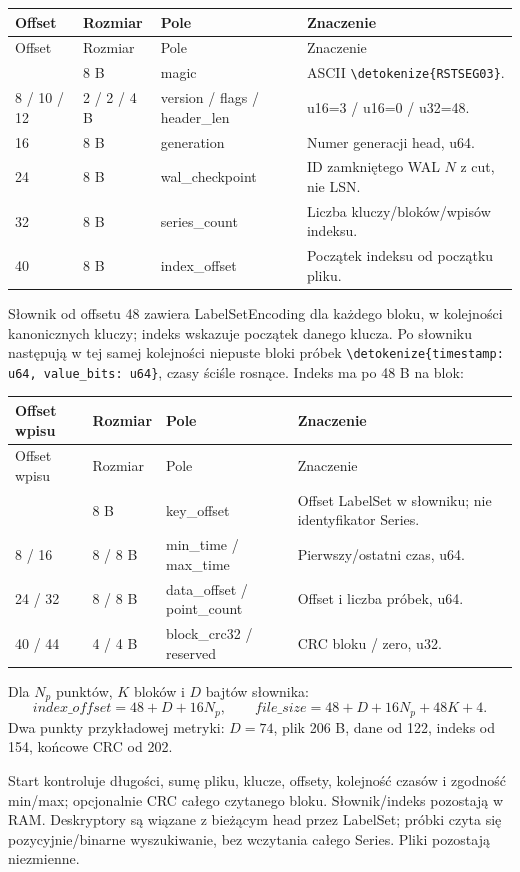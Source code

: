 \documentclass[11pt,a4paper]{article}
\newcommand{\code}[1]{\expandafter\nolinkurl\expandafter{\detokenize{#1}}}
\newcommand{\tabhead}[1]{\toprule #1\\ \midrule\endfirsthead
  \toprule #1\\ \midrule\endhead \bottomrule\endfoot}
\begin{document}
\begin{longtable}{P{18mm}P{23mm}P{34mm}P{81mm}}
\tabhead{Offset & Rozmiar & Pole & Znaczenie}
0 & 8 B & magic & ASCII \code{RSTSEG03}.\\
8 / 10 / 12 & 2 / 2 / 4 B & version / flags / header\_len &
u16=3 / u16=0 / u32=48.\\
16 & 8 B & generation & Numer generacji head, u64.\\
24 & 8 B & wal\_checkpoint & ID zamkniętego WAL $N$ z cut, nie LSN.\\
32 & 8 B & series\_count & Liczba kluczy/bloków/wpisów indeksu.\\
40 & 8 B & index\_offset & Początek indeksu od początku pliku.\\
\end{longtable}
Słownik od offsetu 48 zawiera LabelSetEncoding dla każdego bloku,
w kolejności kanonicznych kluczy; indeks wskazuje początek danego klucza.
Po słowniku następują w tej samej kolejności niepuste bloki próbek
\code{timestamp: u64, value_bits: u64}, czasy ściśle rosnące.
Indeks ma po 48 B na blok:
\begin{longtable}{P{18mm}P{23mm}P{34mm}P{81mm}}
\tabhead{Offset wpisu & Rozmiar & Pole & Znaczenie}
0 & 8 B & key\_offset & Offset LabelSet w słowniku; nie identyfikator Series.\\
8 / 16 & 8 / 8 B & min\_time / max\_time & Pierwszy/ostatni czas, u64.\\
24 / 32 & 8 / 8 B & data\_offset / point\_count & Offset i liczba próbek, u64.\\
40 / 44 & 4 / 4 B & block\_crc32 / reserved & CRC bloku / zero, u32.\\
\end{longtable}
Dla $N_p$ punktów, $K$ bloków i $D$ bajtów słownika:
\[
 index\_offset=48+D+16N_p,\qquad
 file\_size=48+D+16N_p+48K+4.
\]
Dwa punkty przykładowej metryki: $D=74$, plik 206 B,
dane od 122, indeks od 154, końcowe CRC od 202.

Start kontroluje długości, sumę pliku, klucze, offsety,
kolejność czasów i zgodność min/max; opcjonalnie CRC całego czytanego bloku.
Słownik/indeks pozostają w RAM. Deskryptory są wiązane z bieżącym head
przez LabelSet; próbki czyta się pozycyjnie/binarne wyszukiwanie,
bez wczytania całego Series. Pliki pozostają niezmienne.
\end{document}
